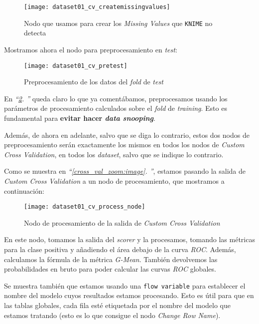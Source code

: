 \documentclass[11pt]{article}
\newcommand{\customcite}[1]{\emph{``\ref{#1}. \nameref{#1}''}}
\begin{document}
\begin{figure}[H]
    \centering
    \texttt{[image: dataset01\_cv\_createmissingvalues]}
    \caption{Nodo que usamos para crear los \emph{Missing Values} que \lstinline{KNIME} no detecta}
    \label{pretest:imagen}
\end{figure}

Mostramos ahora el nodo para preprocesamiento en \emph{test}:

\begin{figure}[H]
    \centering
    \texttt{[image: dataset01\_cv\_pretest]}
    \caption{Preprocesamiento de los datos del \emph{fold} de \emph{test}}
    \label{pretest:imagen}
\end{figure}

En \customcite{pretest:imagen} queda claro lo que ya comentábamos, preprocesamos usando los parámetros de procesamiento calculados sobre el \emph{fold} de \emph{training}. Esto es fundamental para \textbf{evitar hacer \emph{data snooping}}.

Además, de ahora en adelante, salvo que se diga lo contrario, estos dos nodos de preprocesamiento serán exactamente los mismos en todos los nodos de \emph{Custom Cross Validation}, en todos los \emph{dataset}, salvo que se indique lo contrario.

Como se muestra en \customcite{cross_val_zoom:image}, estamos pasando la salida de \emph{Custom Cross Validation} a un nodo de procesamiento, que mostramos a continuación:

\begin{figure}[H]
    \centering
    \texttt{[image: dataset01\_cv\_process\_node]}
    \caption{Nodo de procesamiento de la salida de \emph{Custom Cross Validation}}
\end{figure}

En este nodo, tomamos la salida del \emph{scorer} y la procesamos, tomando las métricas para la clase positiva y añadiendo el área debajo de la curva \emph{ROC}. Además, calculamos la fórmula de la métrica \emph{G-Mean}. También devolvemos las probabilidades en bruto para poder calcular las curvas \emph{ROC} globales.

Se muestra también que estamos usando una \lstinline{flow variable} para establecer el nombre del modelo cuyos resultados estamos procesando. Esto es útil para que en las tablas globales, cada fila esté etiquetada por el nombre del modelo que estamos tratando (esto es lo que consigue el nodo \emph{Change Row Name}).
\end{document}

